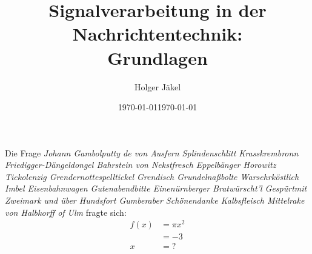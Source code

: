 \documentclass[18pt]{beamer}
\title[Signalverarbeitung in der NT: Grundlagen]{Signalverarbeitung in der Nachrichtentechnik:\\ Grundlagen}
\author[H. Jäkel]{Holger Jäkel}
\date{\americandate\today}
\date{\germandate\today}
\institute{Communications Engineering Lab}
\date{ }
\begin{document}
\begin{frame}
\titlepage
\end{frame}

%
\begin{frame}{Die Frage}
   \emph{Johann Gambolputty de von Ausfern Splindenschlitt Krasskrembronn
   Friedigger-Dängeldongel Bahrstein von Nekstfresch Eppelbänger Horowitz
   Tickolenzig Grendernottespelltickel Grendisch Grundelnaßbolte Warsehrköstlich
   Imbel Eisenbahnwagen Gutenabendbitte Einenürnberger Bratwürscht'l Gespürtmit
   Zweimark und über Hundsfort Gumberaber Schönendanke Kalbsfleisch Mittelrake
   von Halbkorff of Ulm} fragte sich:
  \begin{align}
    \label{eq}
    f(x)&= \pi x^2\\
    &= -3\\[1.2em]
    x&=?
  \end{align}
\end{frame}
\end{document}
